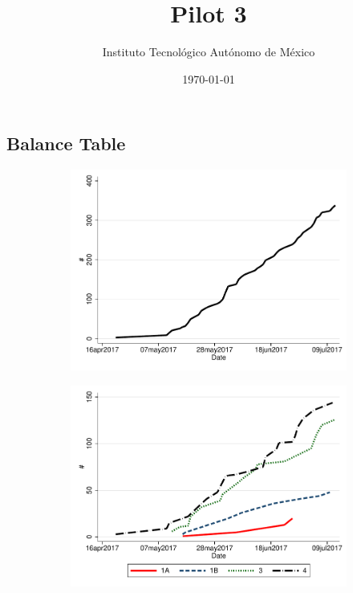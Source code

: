 \documentclass[12pt]{article}
\begin{document}
\title{Pilot 3}

\author{Instituto Tecnológico Autónomo de México}
\date{\today}
\maketitle


\hrulefill




\subsection*{Balance Table}




\begin{figure}[H]
    \caption{Cumulative number of cases by date/treatment}
    \label{}
    \begin{center}
    \begin{subfigure}{0.49\textwidth}
    \centering
        \includegraphics[width=\textwidth]{cum_num_cases.pdf}
     \end{subfigure}
     \begin{subfigure}{0.49\textwidth}
    \centering
        \includegraphics[width=\textwidth]{cum_num_cases_tr.pdf}

\end{subfigure}
\end{center}
\end{figure}
\end{document}
